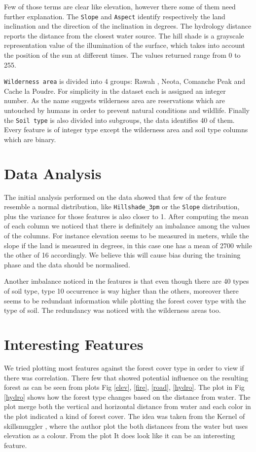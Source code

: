 \documentclass[a4paper, 11pt]{article}
\begin{document}
Few of those terms are clear like elevation, however there some of them need further explanation. The \texttt{Slope} and \texttt{Aspect} identify respectively the land inclination and the direction of the inclination in degrees. The hydrology distance reports the distance from the closest water source. The hill shade is a grayscale representation value of the illumination of the surface, which takes into account the position of the sun at different times. The values returned range from 0 to 255.

\texttt{Wilderness area} is divided into 4 groups: Rawah , Neota, Comanche Peak and Cache la Poudre. For simplicity in the dataset each is assigned an integer number. As the name suggests wilderness area are reservations which are untouched by humans in order to prevent natural conditions and wildlife. Finally the \texttt{Soil type} is also divided into subgroups, the data identifies 40 of them. Every feature is of integer type except the wilderness area and soil type columns which are binary.

\section*{Data Analysis}
The initial analysis performed on the data showed that few of the feature resemble a normal distribution, like \texttt{Hillshade\_3pm} or the \texttt{Slope} distribution, plus the variance for those features is also closer to 1. After computing the mean of each column we noticed that there is definitely an imbalance among the values of the columns. For instance elevation seems to be measured in meters, while the slope if the land is measured in degrees, in this case one has a mean of 2700 while the other of 16 accordingly. We believe this will cause bias during the training phase and the data should be normalised.

Another imbalance noticed in the features is that even though there are 40 types of soil type, type 10 occurrence is way higher than the others, moreover there seems to be redundant information while plotting the forest cover type with the type of soil. The redundancy was noticed with the wilderness areas too.

\section*{Interesting Features}
We tried plotting most features against the forest cover type in order to view if there was correlation. There few that showed potential influence on the resulting forest as can be seen from plots Fig \ref{elev}, \ref{fire}, \ref{road}, \ref{hydro}. The plot in Fig \ref{hydro} shows how the forest type changes based on the distance from water. The plot merge both the vertical and horizontal distance from water and each color in the plot indicated a kind of forest cover. The idea was taken from the Kernel of skillsmuggler \cite{skill}, where the author plot the both distances from the water but uses elevation as a colour. From the plot It does look like it can be an interesting feature.
\end{document}
